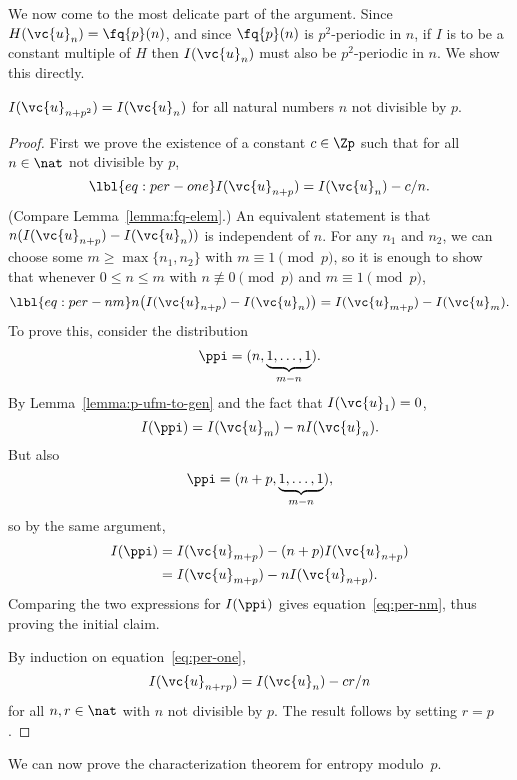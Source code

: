 We now come to the most delicate part of the argument.  Since $H(\vc{u}_n)
= \fq{p}(n)$, and since $\fq{p}(n)$ is $p^2$-periodic in $n$, if $I$ is to
be a constant multiple of $H$ then $I(\vc{u}_n)$ must also be
$p^2$-periodic in $n$.  We show this directly.

\begin{lemma}
$I(\vc{u}_{n + p^2}) = I(\vc{u}_n)$ for all natural numbers $n$ not
  divisible by $p$.
\end{lemma}

\begin{proof}
First we prove the existence of a constant $c \in \Zp$ such that for all $n
\in \nat$ not divisible by $p$,
% 
\begin{equation}
\lbl{eq:per-one}
I(\vc{u}_{n + p}) = I(\vc{u}_n) - c/n.
\end{equation}
% 
(Compare Lemma~\ref{lemma:fq-elem}.)  An
equivalent statement is that $n(I(\vc{u}_{n + p}) - I(\vc{u}_n))$ is
independent of $n$.  For any $n_1$ and $n_2$, we can
choose some $m \geq \max\{n_1, n_2\}$ with $m \equiv 1 \pmod{p}$, so it is
enough to show that whenever $0 \leq n \leq m$ with $n \not\equiv 0
\pmod{p}$ and $m \equiv 1 \pmod{p}$,
% 
\begin{equation}
\lbl{eq:per-nm}
n \bigl( I(\vc{u}_{n + p}) - I(\vc{u}_{n}) \bigr)
=
I(\vc{u}_{m + p}) - I(\vc{u}_{m}).
\end{equation}
% 
To prove this, consider the distribution
\[
\ppi = (n, \underbrace{1, \ldots, 1}_{m - n}).
\]
By Lemma~\ref{lemma:p-ufm-to-gen} and the fact that $I(\vc{u}_1) = 0$,
\[
I(\ppi) = I(\vc{u}_m) - nI(\vc{u}_n).
\]
But also
\[
\ppi = (n + p, \underbrace{1, \ldots, 1}_{m - n}),
\]
so by the same argument,
% 
\begin{align*}
I(\ppi) &
=
I(\vc{u}_{m + p}) - (n + p)I(\vc{u}_{n + p})    \\
&
= 
I(\vc{u}_{m + p}) - nI(\vc{u}_{n + p}).
\end{align*}
% 
Comparing the two expressions for $I(\ppi)$ gives
equation~\eqref{eq:per-nm}, thus proving the initial claim.

By induction on equation~\eqref{eq:per-one},
\[
I(\vc{u}_{n + rp}) = I(\vc{u}_n) - cr/n
\]
for all $n, r \in \nat$ with $n$ not divisible by $p$.  The result 
follows by setting $r = p$.
\end{proof}

We can now prove the characterization theorem for entropy modulo~$p$.

